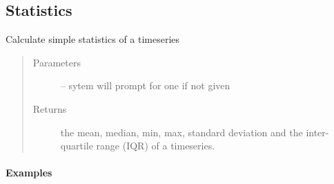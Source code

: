 \documentclass[letterpaper,10pt,english]{sphinxmanual}
\begin{document}
\subsection{Statistics}
\label{\detokenize{Main:statistics}}

\begin{fulllineitems}
\label{\detokenize{Main:pyleoclim.statsTs}}
Calculate simple statistics of a timeseries
\begin{quote}\begin{description}
\item[{Parameters}] \leavevmode
{} -- sytem will prompt for one if not given

\item[{Returns}] \leavevmode
the mean, median, min, max, standard deviation and the
inter-quartile range (IQR) of a timeseries.

\end{description}\end{quote}
\paragraph{Examples}

\begin{sphinxVerbatim}[commandchars=\\\{\}]
       
\end{sphinxVerbatim}

\end{fulllineitems}

\end{document}
